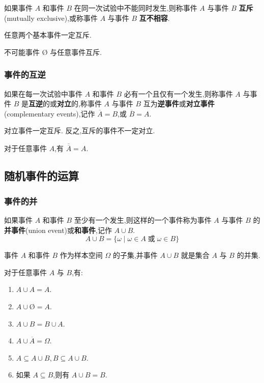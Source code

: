 如果事件 $A$ 和事件 $B$ 在同一次试验中不能同时发生,则称事件 $A$ 与事件 $B$ \textbf{互斥}(mutually exclusive),或称事件 $A$ 与事件 $B$ \textbf{互不相容}.

任意两个基本事件一定互斥.

不可能事件 $\text{\O}$ 与任意事件互斥.

\subsubsection{事件的互逆}

如果在每一次试验中事件 $A$ 和事件 $B$ 必有一个且仅有一个发生,则称事件 $A$ 与事件 $B$ 是\textbf{互逆}的或\textbf{对立}的,称事件 $A$ 与事件 $B$ 互为\textbf{逆事件}或\textbf{对立事件}(complementary events),记作 $\overline{A}=B$,或 $\overline{B}=A$.

对立事件一定互斥. 反之,互斥的事件不一定对立.

\begin{property}
    \indent 对于任意事件 $A$,有 $\overline{\overline{A}}=A$.
\end{property}

\subsection{随机事件的运算}

\subsubsection{事件的并}

如果事件 $A$ 和事件 $B$ 至少有一个发生,则这样的一个事件称为事件 $A$ 与事件 $B$ 的\textbf{并事件}(union event)或\textbf{和事件},记作 $A \cup B$.
$$
A \cup B = \{ \omega \mid \omega \in A \;\text{或}\; \omega \in B \}
$$

事件 $A$ 和事件 $B$ 作为样本空间 $\varOmega$ 的子集,并事件 $A \cup B$ 就是集合 $A$ 与 $B$ 的并集.

\begin{property}
    \indent 对于任意事件 $A$ 与 $B$,有:
    \begin{enumerate}
        \item $A \cup A = A$.
        \item $A \cup \text{\O} = A$.
        \item $A \cup B = B \cup A$.
        \item $A \cup \overline{A} = \varOmega$.
        \item $A \subseteq A \cup B, B \subseteq A \cup B$.
        \item 如果 $A \subseteq B$,则有 $A \cup B=B$.
    \end{enumerate}
\end{property}

